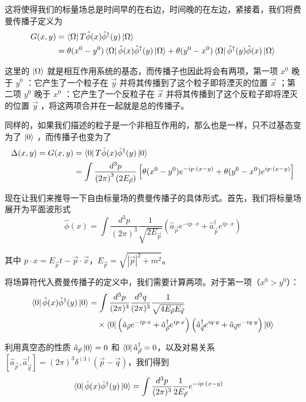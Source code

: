 这将使得我们的标量场总是时间早的在右边，时间晚的在左边，紧接着，我们将费曼传播子定义为
\begin{align*}
    G(x,y) &= \bra{\Omega}T\hat{\phi}(x)\hat{\phi}^\dagger(y)\ket{\Omega} \\
    &= \theta(x^0 - y^0)\bra{\Omega}\hat{\phi}(x)\hat{\phi}^\dagger(y)\ket{\Omega} + \theta(y^0 - x^0)\bra{\Omega}\hat{\phi}^\dagger(y)\hat{\phi}(x)\ket{\Omega}
\end{align*}

这里的 $\ket{\Omega}$ 就是相互作用系统的基态，而传播子也因此将会有两项，第一项 $x^0$ 晚于 $y^0$ ：它产生了一个粒子在 $\vec{y}$ 并将其传播到了这个粒子即将湮灭的位置 $\vec{x}$ ；第二项 $y^0$ 晚于 $x^0$ ：它产生了一个反粒子在 $\vec{x}$ 并将其传播到了这个反粒子即将湮灭的位置 $\vec{y}$ ，将这两项合并在一起就是总的传播子。

同样的，如果我们描述的粒子是一个非相互作用的，那么也是一样，只不过基态变为了 $\ket{0}$ ，而传播子也变为了
\begin{align*}
    \Delta(x,y) = G(x,y) &= \bra{0}T\hat{\phi}(x)\hat{\phi}^\dagger(y)\ket{0} \\
    &= \int \frac{d^3p}{\left(2\pi\right)^3\left(2E_{\vec{p}}\right)}\left[\theta(x^0 - y^0)e^{-ip\cdot(x - y)} + \theta(y^0 - x^0)e^{ip\cdot\left(x - y\right)}\right]
\end{align*}

现在让我们来推导一下自由标量场的费曼传播子的具体形式。首先，我们将标量场展开为平面波形式
\begin{equation*}
    \hat{\phi}(x) = \int \frac{d^3p}{(2\pi)^3} \frac{1}{\sqrt{2E_{\vec{p}}}} \left( \hat{a}_{\vec{p}} e^{-ip\cdot x} + \hat{a}_{\vec{p}}^\dagger e^{ip\cdot x} \right)
\end{equation*}

其中 $p\cdot x = E_{\vec{p}}t - \vec{p}\cdot\vec{x}$，$E_{\vec{p}} = \sqrt{|\vec{p}|^2 + m^2}$。

将场算符代入费曼传播子的定义中，我们需要计算两项。对于第一项（$x^0 > y^0$）：
\begin{align*}
    \bra{0}\hat{\phi}(x)\hat{\phi}^\dagger(y)\ket{0} &= \int \frac{d^3p}{(2\pi)^3} \frac{d^3q}{(2\pi)^3} \frac{1}{\sqrt{4E_{\vec{p}}E_{\vec{q}}}} \\
    &\quad \times \bra{0}\left( \hat{a}_{\vec{p}} e^{-ip\cdot x} + \hat{a}_{\vec{p}}^\dagger e^{ip\cdot x} \right)\left( \hat{a}_{\vec{q}}^\dagger e^{iq\cdot y} + \hat{a}_{\vec{q}} e^{-iq\cdot y} \right)\ket{0}
\end{align*}

利用真空态的性质 $\hat{a}_{\vec{p}}\ket{0} = 0$ 和 $\bra{0}\hat{a}_{\vec{p}}^\dagger = 0$，以及对易关系 $[\hat{a}_{\vec{p}}, \hat{a}_{\vec{q}}^\dagger] = (2\pi)^3 \delta^{(3)}(\vec{p} - \vec{q})$，我们得到
\begin{align*}
    \bra{0}\hat{\phi}(x)\hat{\phi}^\dagger(y)\ket{0} &= \int \frac{d^3p}{(2\pi)^3} \frac{1}{2E_{\vec{p}}} e^{-ip\cdot(x-y)}
\end{align*}

